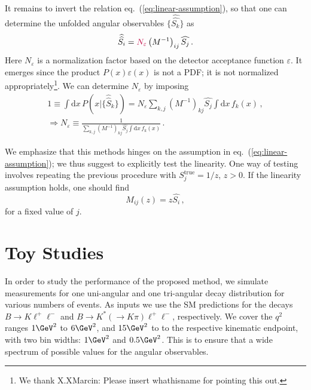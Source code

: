 \documentclass[aps,prd,reprint,nofootinbib,preprintnumbers]{revtex4}
\newcommand{\est}[1]{\widehat{#1}}
\newcommand{\refeq}[1]{eq.~(\ref{eq:#1})}
\newcommand{\rmdx}[1]{\mbox{d} #1 \,} %
\let\eps\varepsilon
\newcommand{\wwhat}[1]{\widehat{\widehat{#1}}}
\newcommand{\danny}[1]{{\color{purple}#1}}
\begin{document}
It remains to invert the relation \refeq{linear-assumption}, so that one can determine the unfolded
angular observables $\lbrace \wwhat{S_k}\rbrace$ as
\begin{equation}
    \wwhat{S_i} = \danny{N_\eps} \left(M^{-1}\right)_{ij} \est{S_j}\,.
\end{equation}
\danny{Here $N_\eps$ is a normalization factor based on the detector acceptance function $\eps$. It emerges
    since the product $P(x) \eps(x)$ is not a PDF; it is not normalized appropriately\footnote{We thank
    X.X\danny{Marcin: Please insert whathisname} for pointing this out.}. We can determine $N_\eps$ by
    imposing
    \begin{gather}
        1 \equiv \int \rmdx{x} P(x | \lbrace \wwhat{S}_k\rbrace) = N_\eps \sum_{k,j} \left(M^{-1}\right)_{kj} \est{S_j}\int \rmdx{x} f_k(x)\,,\\
        \Rightarrow N_\eps \equiv \frac{1}{\sum_{k,j} \left(M^{-1}\right)_{kj} \est{S_j} \int \rmdx{x} f_k(x)}\,.
    \end{gather}
}

We emphasize that this methods hinges on the assumption in \refeq{linear-assumption}; we thus suggest to explicitly
test the linearity. One way of testing involves repeating the previous procedure
with $S_j^\text{true} = 1/z$, $z > 0$. If the linearity assumption holds, one should find
\begin{equation}
    M_{ij}(z) = z \est{S_i}\,,
\end{equation}
for a fixed value of $j$.


\section{Toy Studies}
\label{sec:numerics}

In order to study the performance of the proposed method, we simulate measurements for one uni-angular
and one tri-angular decay distribution for various numbers of events. As inputs we use the SM predictions
for the decays $B\to K\ell^+\ell^-$ and $B\to K^*(\to K\pi)\ell^+\ell^-$, respectively. We cover the
$q^2$ ranges $1\GeV^2$ to $6\GeV^2$, and $15\GeV^2$ to to the respective kinematic endpoint, with two
bin widths: $1\GeV^2$ and $0.5\GeV^2$. This is to ensure that a wide spectrum of possible values for
the angular observables.\\
\end{document}
